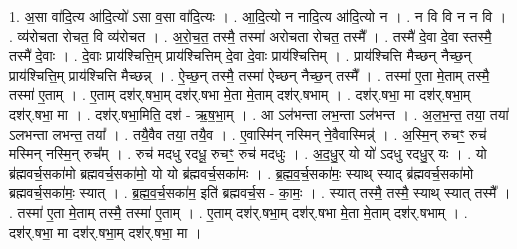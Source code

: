 \documentclass[17pt]{extarticle}
\begin{document}
1. अ॒सा वा॑दि॒त्य आ॑दि॒त्यो॑ ऽसा व॒सा वा॑दि॒त्यः । . आ॒दि॒त्यो न नादि॒त्य आ॑दि॒त्यो न । . न वि वि न न वि । . व्य॑रोचता रोचत॒ वि व्य॑रोचत । . अ॒रो॒च॒त॒ तस्मै॒ तस्मा॑ अरोचता रोचत॒ तस्मै᳚ । . तस्मै॑ दे॒वा दे॒वा स्तस्मै॒ तस्मै॑ दे॒वाः । . दे॒वाः प्राय॑श्चित्ति॒म् प्राय॑श्चित्तिम् दे॒वा दे॒वाः प्राय॑श्चित्तिम् । . प्राय॑श्चित्ति मैच्छन् नैच्छ॒न् प्राय॑श्चित्ति॒म् प्राय॑श्चित्ति मैच्छन्न् । . ऐ॒च्छ॒न् तस्मै॒ तस्मा॑ ऐच्छन् नैच्छ॒न् तस्मै᳚ । . तस्मा॑ ए॒ता मे॒ताम् तस्मै॒ तस्मा॑ ए॒ताम् । . ए॒ताम् दश॑र्.षभा॒म् दश॑र्.षभा मे॒ता मे॒ताम् दश॑र्.षभाम् । . दश॑र्.षभा॒ मा दश॑र्.षभा॒म् दश॑र्.षभा॒ मा । . दश॑र्.षभा॒मिति॒ दश॑ - ऋ॒ष॒भा॒म् । . आ ऽल॑भन्ता लभ॒न्ता ऽल॑भन्त । . अ॒ल॒भ॒न्त॒ तया॒ तया॑ ऽलभन्ता लभन्त॒ तया᳚ । . तयै॒वैव तया॒ तयै॒व । . ए॒वास्मि॑न् नस्मिन् ने॒वैवास्मिन्न्॑ । . अ॒स्मि॒न् रुचꣳ॒॒ रुच॑ मस्मिन् नस्मि॒न् रुच᳚म् । . रुच॑ मदधु रदधू॒ रुचꣳ॒॒ रुच॑ मदधुः । . अ॒द॒धु॒र् यो यो॑ ऽदधु रदधु॒र् यः । . यो ब्र॑ह्मवर्च॒सका॑मो ब्रह्मवर्च॒सका॑मो॒ यो यो ब्र॑ह्मवर्च॒सका॑मः । . ब्र॒ह्म॒व॒र्च॒सका॑मः॒ स्याथ् स्याद् ब्र॑ह्मवर्च॒सका॑मो ब्रह्मवर्च॒सका॑मः॒ स्यात् । . ब्र॒ह्म॒व॒र्च॒सका॑म॒ इति॑ ब्रह्मवर्च॒स - का॒मः॒ । . स्यात् तस्मै॒ तस्मै॒ स्याथ् स्यात् तस्मै᳚ । . तस्मा॑ ए॒ता मे॒ताम् तस्मै॒ तस्मा॑ ए॒ताम् । . ए॒ताम् दश॑र्.षभा॒म् दश॑र्.षभा मे॒ता मे॒ताम् दश॑र्.षभाम् । . दश॑र्.षभा॒ मा दश॑र्.षभा॒म् दश॑र्.षभा॒ मा । \newline
\end{document}
